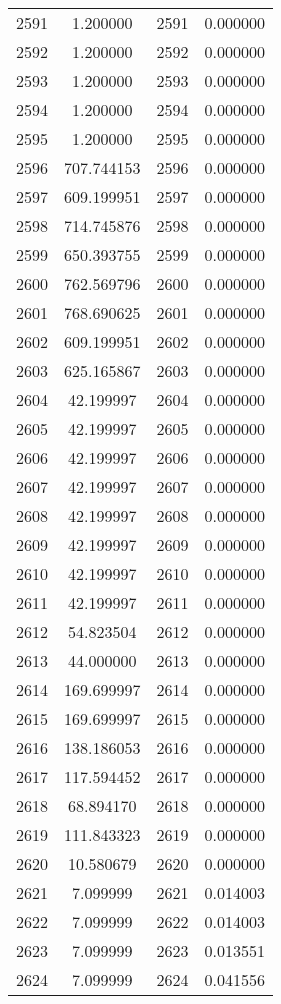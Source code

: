 \documentclass[12pt]{article}
\begin{document}
\begin{longtable}{@{}cccc@{}}
2591 & 1.200000 & 2591 & 0.000000 \\
2592 & 1.200000 & 2592 & 0.000000 \\
2593 & 1.200000 & 2593 & 0.000000 \\
2594 & 1.200000 & 2594 & 0.000000 \\
2595 & 1.200000 & 2595 & 0.000000 \\
2596 & 707.744153 & 2596 & 0.000000 \\
2597 & 609.199951 & 2597 & 0.000000 \\
2598 & 714.745876 & 2598 & 0.000000 \\
2599 & 650.393755 & 2599 & 0.000000 \\
2600 & 762.569796 & 2600 & 0.000000 \\
2601 & 768.690625 & 2601 & 0.000000 \\
2602 & 609.199951 & 2602 & 0.000000 \\
2603 & 625.165867 & 2603 & 0.000000 \\
2604 & 42.199997 & 2604 & 0.000000 \\
2605 & 42.199997 & 2605 & 0.000000 \\
2606 & 42.199997 & 2606 & 0.000000 \\
2607 & 42.199997 & 2607 & 0.000000 \\
2608 & 42.199997 & 2608 & 0.000000 \\
2609 & 42.199997 & 2609 & 0.000000 \\
2610 & 42.199997 & 2610 & 0.000000 \\
2611 & 42.199997 & 2611 & 0.000000 \\
2612 & 54.823504 & 2612 & 0.000000 \\
2613 & 44.000000 & 2613 & 0.000000 \\
2614 & 169.699997 & 2614 & 0.000000 \\
2615 & 169.699997 & 2615 & 0.000000 \\
2616 & 138.186053 & 2616 & 0.000000 \\
2617 & 117.594452 & 2617 & 0.000000 \\
2618 & 68.894170 & 2618 & 0.000000 \\
2619 & 111.843323 & 2619 & 0.000000 \\
2620 & 10.580679 & 2620 & 0.000000 \\
2621 & 7.099999 & 2621 & 0.014003 \\
2622 & 7.099999 & 2622 & 0.014003 \\
2623 & 7.099999 & 2623 & 0.013551 \\
2624 & 7.099999 & 2624 & 0.041556 \\

\end{longtable}
\end{document}

